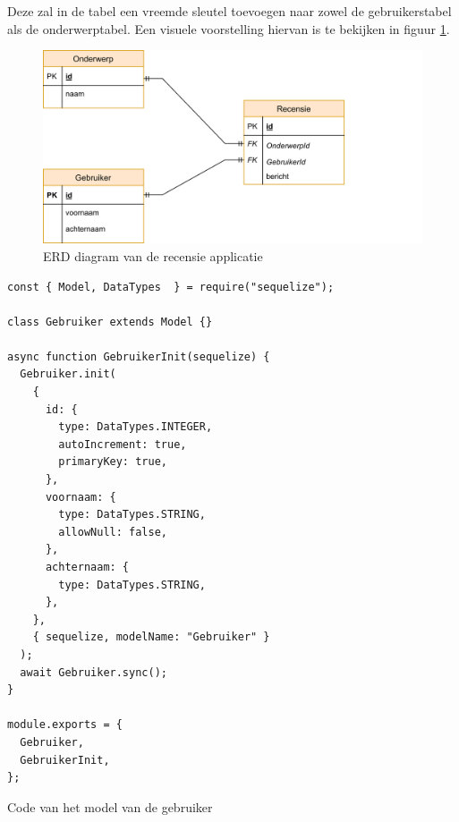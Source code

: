 Deze zal in de tabel een vreemde sleutel toevoegen naar zowel de gebruikerstabel als de onderwerptabel.
Een visuele voorstelling hiervan is te bekijken in figuur \ref{fig:erd}.
\begin{figure}[H]
  \centering
  \includegraphics{graphics/erd.png}
  \caption[ERD recensie applicatie]{\label{fig:erd}ERD diagram van de recensie applicatie}
\end{figure}
\begin{listing}[H]
  \centering
  \begin{verbatim}
const { Model, DataTypes  } = require("sequelize");

class Gebruiker extends Model {}

async function GebruikerInit(sequelize) {
  Gebruiker.init(
    {
      id: {
        type: DataTypes.INTEGER,
        autoIncrement: true,
        primaryKey: true,
      },
      voornaam: {
        type: DataTypes.STRING,
        allowNull: false,
      },
      achternaam: {
        type: DataTypes.STRING,
      },
    },
    { sequelize, modelName: "Gebruiker" }
  );
  await Gebruiker.sync();
}

module.exports = {
  Gebruiker,
  GebruikerInit,
};
\end{verbatim}
\caption[Model gebruiker]{\label{code:User}Code van het model van de gebruiker}
\end{listing}

